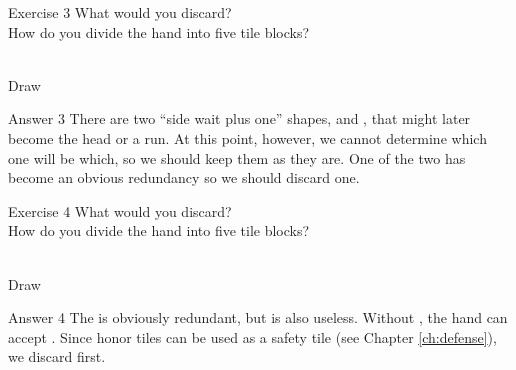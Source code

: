 \vfill

\begin{itembox}[l]{Exercise 3}
What would you discard? \\
\vsp
How do you divide the hand into five tile blocks?

\bp
{}~\\
\hfill\footnotesize{Draw~~~~~~~~~~~}
\ep
\end{itembox}


\newpage

\begin{itembox}[r]{Answer 3}
\emj
There are two ``side wait plus one'' shapes, {\LARGE{}} and {\LARGE{}}, that might later become the head or a run. At this point, however, we cannot determine which one will be which, so we should keep them as they are.
One of the two {\LARGE{}} has become an obvious redundancy so we should discard one.
\end{itembox}

\vfill

\begin{itembox}[l]{Exercise 4}
What would you discard? \\
\vsp
How do you divide the hand into five tile blocks?

\bp
{}\bei~\\
\hfill\footnotesize{Draw~~~~~~~~~~~}
\ep
\end{itembox}


\newpage

\begin{itembox}[r]{Answer 4}
\emj
The {\LARGE\bei} is obviously redundant, but {\LARGE{}} is also useless. Without {\LARGE{}}, the hand can accept {\LARGE{}}. Since honor tiles can be used as a safety tile (see Chapter \ref{ch:defense}), we discard {\LARGE{}} first.
\end{itembox}

